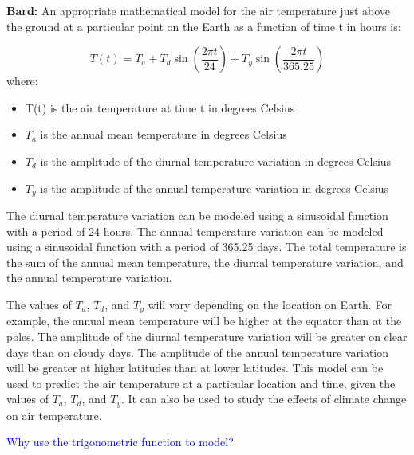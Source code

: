 \documentclass[11pt]{article} %
\begin{document}
\begin{mdframed}[
        backgroundcolor=white,  %
        linecolor=black,        %
        leftmargin=5pt,         %
        rightmargin=5pt,        %
        linewidth=2pt           %
    ]
    \textbf{Bard: } An appropriate mathematical model for the air temperature just above the ground at a particular point on the Earth as a function of time t in hours is: \par
    $$
        T(t) = T_a + T_d \sin(\frac{2 \pi t }{24}) + T_y \sin (\frac{2 \pi t }{365.25})
    $$
    where:
    \begin{itemize}
        \item T(t) is the air temperature at time t in degrees Celsius
        \item $T_a$ is the annual mean temperature in degrees Celsius
        \item $T_d$ is the amplitude of the diurnal temperature variation in degrees Celsius
        \item $T_y$ is the amplitude of the annual temperature variation in degrees Celsius
    \end{itemize}
    The diurnal temperature variation can be modeled using a sinusoidal function with a period of 24 hours. The annual temperature variation can be modeled using a sinusoidal function with a period of 365.25 days. The total temperature is the sum of the annual mean temperature, the diurnal temperature variation, and the annual temperature variation. \par
    The values of $T_a$, $T_d$, and $T_y$ will vary depending on the location on Earth. For example, the annual mean temperature will be higher at the equator than at the poles. The amplitude of the diurnal temperature variation will be greater on clear days than on cloudy days. The amplitude of the annual temperature variation will be greater at higher latitudes than at lower latitudes.
    This model can be used to predict the air temperature at a particular location and time, given the values of $T_a$, $T_d$, and $T_y$. It can also be used to study the effects of climate change on air temperature. \par
\end{mdframed}
% 
% 
% 
% 
% 
\textcolor{blue}{Why use the  trigonometric function to model?}
\end{document}
